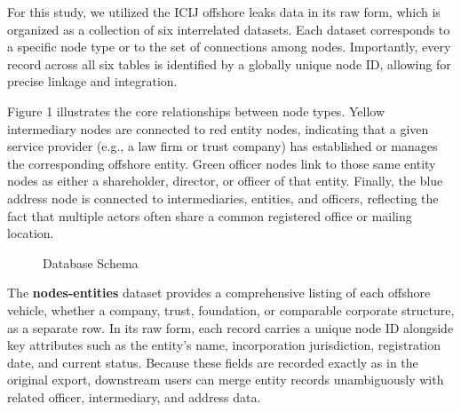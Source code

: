 \documentclass{article}
\begin{document}
For this study, we utilized the ICIJ offshore leaks data in its raw form, which is organized as a collection of six interrelated datasets. Each dataset corresponds to a specific node type or to the set of connections among nodes. Importantly, every record across all six tables is identified by a globally unique node ID, allowing for precise linkage and integration.

Figure 1 illustrates the core relationships between node types. Yellow intermediary nodes are connected to red entity nodes, indicating that a given service provider (e.g., a law firm or trust company) has established or manages the corresponding offshore entity. Green officer nodes link to those same entity nodes as either a shareholder, director, or officer of that entity. Finally, the blue address node is connected to intermediaries, entities, and officers, reflecting the fact that multiple actors often share a common registered office or mailing location.

\begin{figure}[H]
  \centering
    \caption{Database Schema}
  \label{fig:fig1}
\end{figure}



\newpage

The \textbf{nodes-entities} dataset provides a comprehensive listing of each offshore vehicle, whether a company, trust, foundation, or comparable corporate structure, as a separate row. In its raw form, each record carries a unique node ID alongside key attributes such as the entity’s name, incorporation jurisdiction, registration date, and current status. Because these fields are recorded exactly as in the original export, downstream users can merge entity records unambiguously with related officer, intermediary, and address data.
\end{document}
